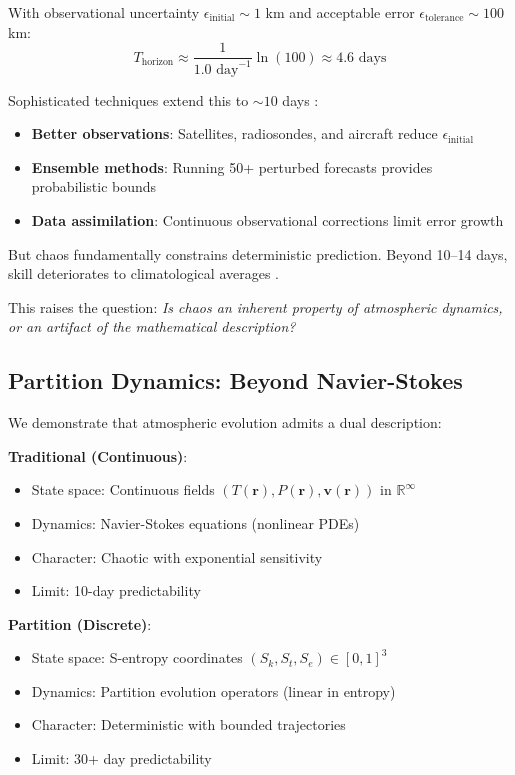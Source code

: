 \documentclass[twocolumn,10pt,a4paper]{article}
\theoremstyle{definition}
\theoremstyle{remark}
\begin{document}
With observational uncertainty $\epsilon_{\text{initial}} \sim 1$ km and acceptable error $\epsilon_{\text{tolerance}} \sim 100$ km:
\begin{equation}
    T_{\text{horizon}} \approx \frac{1}{1.0 \text{ day}^{-1}} \ln(100) \approx 4.6 \text{ days}
\end{equation}

Sophisticated techniques extend this to $\sim 10$ days \cite{ecmwf2020skill}:
\begin{itemize}
    \item \textbf{Better observations}: Satellites, radiosondes, and aircraft reduce $\epsilon_{\text{initial}}$
    \item \textbf{Ensemble methods}: Running 50+ perturbed forecasts provides probabilistic bounds
    \item \textbf{Data assimilation}: Continuous observational corrections limit error growth
\end{itemize}

But chaos fundamentally constrains deterministic prediction. Beyond 10--14 days, skill deteriorates to climatological averages \cite{zhang2019advancement}.

This raises the question: \textit{Is chaos an inherent property of atmospheric dynamics, or an artifact of the mathematical description?}

\subsection{Partition Dynamics: Beyond Navier-Stokes}

We demonstrate that atmospheric evolution admits a dual description:

\textbf{Traditional (Continuous)}:
\begin{itemize}
    \item State space: Continuous fields $(T(\mathbf{r}), P(\mathbf{r}), \mathbf{v}(\mathbf{r}))$ in $\mathbb{R}^{\infty}$
    \item Dynamics: Navier-Stokes equations (nonlinear PDEs)
    \item Character: Chaotic with exponential sensitivity
    \item Limit: 10-day predictability
\end{itemize}

\textbf{Partition (Discrete)}:
\begin{itemize}
    \item State space: S-entropy coordinates $(S_k, S_t, S_e) \in [0,1]^3$
    \item Dynamics: Partition evolution operators (linear in entropy)
    \item Character: Deterministic with bounded trajectories
    \item Limit: 30+ day predictability
\end{itemize}
\end{document}
